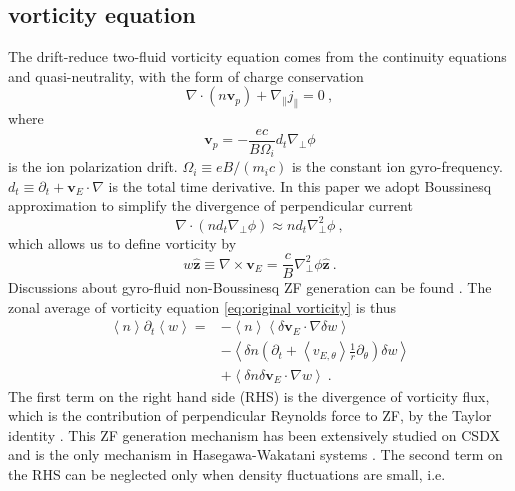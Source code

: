 \documentclass[aps,pre,twocolumn,superscriptaddress]{revtex4-2}
\begin{document}
\subsection{\label{subsec:vorticity equation}vorticity equation}
The drift-reduce two-fluid vorticity equation comes from the continuity equations and quasi-neutrality, with the form of charge conservation \cite{Zeiler_1997}
\begin{equation}
	\nabla\cdot\left(n\bm{v}_{p}\right)+\nabla_{\parallel}j_{\parallel}=0~,
\label{eq:original vorticity}
\end{equation}
where 
\begin{equation}
	\bm{v}_{p}=-\frac{ec}{B\Omega_{i}}d_t\nabla_{\perp}\phi
\end{equation}
is the ion polarization drift. $\Omega_{i}\equiv eB/\left(m_{i}c\right)$ is the constant ion gyro-frequency. $d_{t}\equiv\partial_{t}+\bm{v}_{E}\cdot\nabla$ is the total time derivative. In this paper we adopt Boussinesq approximation \cite{Ricci_2012} to simplify the divergence of perpendicular current
\begin{equation}
	\nabla\cdot\left(nd_{t}\nabla_{\perp}\phi\right)\approx nd_{t}\nabla_{\perp}^{2}\phi~,
\label{eq:Boussinesq}
\end{equation}
which allows us to define vorticity by
\begin{equation}
	w\hat{\bm{z}}\equiv\nabla\times\bm{v}_{E}
	=\frac{c}{B}\nabla_{\perp}^{2}\phi\hat{\bm{z}}~.
\end{equation}
Discussions about gyro-fluid non-Boussinesq ZF generation can be found \cite{Held_2018}. The zonal average of vorticity equation \cref{eq:original vorticity} is thus
\begin{equation}
\begin{aligned}
	\left<n\right>\partial_{t}\left<w\right>=&-\left<n\right>\left<\delta\bm{v}_{E}\cdot\nabla\delta w\right> \\
	&-\left<\delta n\left(\partial_{t}+\left<v_{E,\theta}\right>\frac{1}{r}\partial_{\theta}\right)\delta w\right> \\
	&+\left<\delta n\delta\bm{v}_{E}\cdot\nabla w\right>~.
\end{aligned}
\end{equation}
The first term on the right hand side (RHS) is the divergence of vorticity flux, which is the contribution of perpendicular Reynolds force to ZF, by the Taylor identity \cite{Li_2018,Diamond_1991}. This ZF generation mechanism has been extensively studied on CSDX \cite{Holland_2006,Yan_2008,Yan_2010,Thakur_2018} and is the only mechanism in Hasegawa-Wakatani systems \cite{Hasegawa_1983,Hajjar_2018}. The second term on the RHS can be neglected only when density fluctuations are small, i.e.
\end{document}
